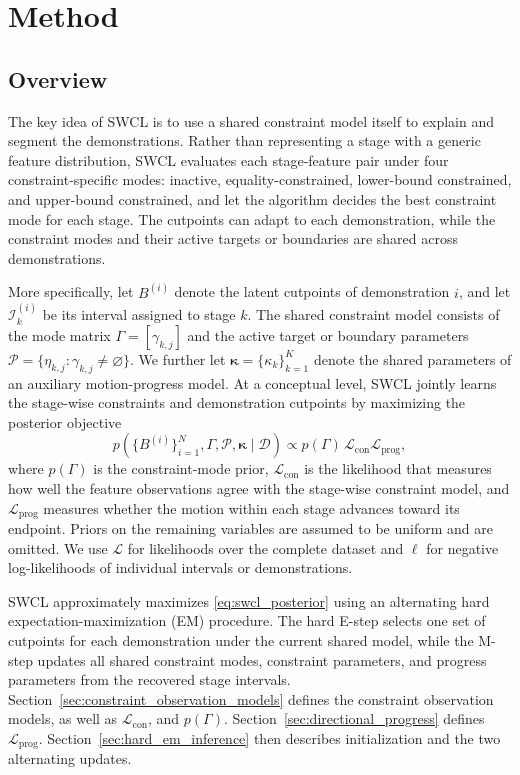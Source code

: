 \section{Method}
\label{sec:method}

\subsection{Overview}
The key idea of SWCL is to use a shared constraint model itself to explain and segment the demonstrations. Rather than representing a stage with a generic feature distribution, SWCL evaluates each stage-feature pair under four constraint-specific modes: inactive, equality-constrained, lower-bound constrained, and upper-bound constrained, and let the algorithm decides the best constraint mode for each stage. The cutpoints can adapt to each demonstration, while the constraint modes and their active targets or boundaries are shared across demonstrations.

More specifically, let $B^{(i)}$ denote the latent cutpoints of demonstration $i$, and let $\mathcal{I}_k^{(i)}$ be its interval assigned to stage $k$. The shared constraint model consists of the mode matrix $\Gamma=[\gamma_{k,j}]$ and the active target or boundary parameters $\mathcal{P}=\{\eta_{k,j}:\gamma_{k,j}\neq\varnothing\}$. We further let $\boldsymbol{\kappa}=\{\kappa_k\}_{k=1}^{K}$ denote the shared parameters of an auxiliary motion-progress model. At a conceptual level, SWCL jointly learns the stage-wise constraints and demonstration cutpoints by maximizing the posterior objective
\begin{equation}
p\!\left(\{B^{(i)}\}_{i=1}^{N},\Gamma,\mathcal{P},
\boldsymbol{\kappa}\mid\mathcal{D}\right)
\propto
p(\Gamma)\,
\mathcal{L}_{\mathrm{con}}
\mathcal{L}_{\mathrm{prog}},
\label{eq:swcl_posterior}
\end{equation}
where $p(\Gamma)$ is the constraint-mode prior, $\mathcal{L}_{\mathrm{con}}$ is the likelihood that measures how well the feature observations agree with the stage-wise constraint model, and $\mathcal{L}_{\mathrm{prog}}$ measures whether the motion within each stage advances toward its endpoint. Priors on the remaining variables are assumed to be uniform and are omitted. We use $\mathcal{L}$ for likelihoods over the complete dataset and $\ell$ for negative log-likelihoods of individual intervals or demonstrations.

SWCL approximately maximizes \eqref{eq:swcl_posterior} using an alternating hard expectation-maximization (EM) procedure. The hard E-step selects one set of cutpoints for each demonstration under the current shared model, while the M-step updates all shared constraint modes, constraint parameters, and progress parameters from the recovered stage intervals. Section~\ref{sec:constraint_observation_models} defines the constraint observation models, as well as $\mathcal{L}_{\mathrm{con}}$, and $p(\Gamma)$. Section~\ref{sec:directional_progress} defines $\mathcal{L}_{\mathrm{prog}}$. Section~\ref{sec:hard_em_inference} then describes initialization and the two alternating updates.

